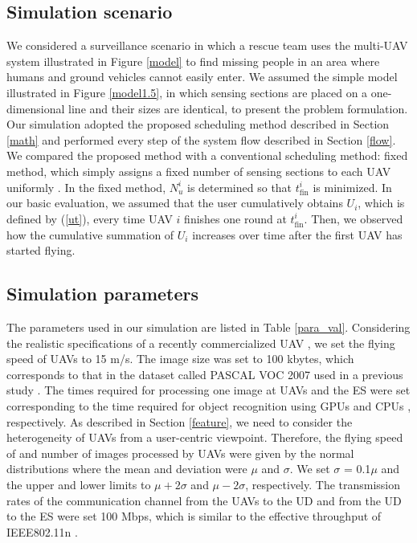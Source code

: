 \documentclass{ieeeaccess}
\begin{document}
\subsection{Simulation scenario}
We considered a surveillance scenario in which a rescue team uses the multi-UAV system illustrated in Figure \ref{model} to find missing people in an area where humans and ground vehicles cannot easily enter. We assumed the simple model illustrated in Figure \ref{model1.5}, in which sensing sections are placed on a one-dimensional line and their sizes are identical, to present the problem formulation. Our simulation adopted the proposed scheduling method described in Section \ref{math} and performed every step of the system flow described in Section \ref{flow}. We compared the proposed method with a conventional scheduling method: fixed method, which simply assigns a fixed number of sensing sections to each UAV uniformly \cite{chang2016}. In the fixed method, $N_u^i$ is determined so that $t_{\mathrm{fin}}^i$ is minimized. In our basic evaluation, we assumed that the user cumulatively obtains $U_i$, which is defined by (\ref{ut}), every time UAV $i$ finishes one round at $t_{\mathrm{fin}}^i$. Then, we observed how the cumulative summation of $U_i$ increases over time after the first UAV has started flying.

\subsection{Simulation parameters}
The parameters used in our simulation are listed in Table \ref{para_val}. Considering the realistic specifications of a recently commercialized UAV \cite{bebop2}, we set the flying speed of UAVs to 15 m/s. The image size was set to 100 kbytes, which corresponds to that in the dataset called PASCAL VOC 2007 used in a previous study \cite{Ren2015}. The times required for processing one image at UAVs and the ES were set corresponding to the time required for object recognition using GPUs and CPUs \cite{Ren2015}, respectively. As described in Section \ref{feature}, we need to consider the heterogeneity of UAVs from a user-centric viewpoint. Therefore, the flying speed of and number of images processed by UAVs were given by the normal distributions where the mean and deviation were $\mu$ and $\sigma$. We set $\sigma$ = 0.1$\mu$ and the upper and lower limits to $\mu+2\sigma$ and $\mu-2\sigma$, respectively. The transmission rates of the communication channel from the UAVs to the UD and from the UD to the ES were set 100 Mbps, which is similar to the effective throughput of IEEE802.11n \cite{Li2013}.
\end{document}
